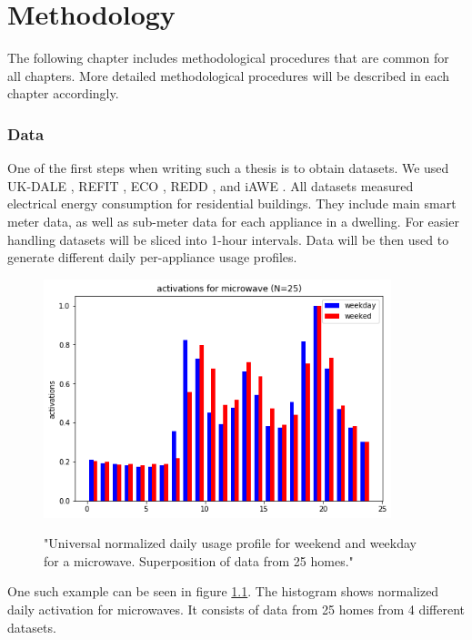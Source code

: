 
\chapter{Methodology} %

\label{Chapter10} 

The following chapter includes methodological procedures that are common for all chapters.
More detailed methodological procedures will be described in each chapter accordingly. 

\subsection{Data}

One of the first steps when writing such a thesis is to obtain datasets.
We used UK-DALE \cite{UKDALE}, REFIT \cite{REFIT}, ECO \cite{ECO}, REDD \cite{REDD}, and iAWE \cite{iAWE}.
All datasets measured electrical energy consumption for residential buildings. 
They include main smart meter data, as well as sub-meter data for each appliance in a dwelling. 
For easier handling datasets will be sliced into 1-hour intervals. 
Data will be then used to generate different daily per-appliance usage profiles.

\begin{figure}[H]
	\centering
	\caption{"Universal normalized daily usage profile for weekend and weekday for a microwave. Superposition of data from 25 homes."}
	\includegraphics[width=0.9\textwidth]{../Figures/microwave_norm_n25.png}
	\label{fig:UniNormMicrowave}
\end{figure}

One such example can be seen in figure \ref{fig:UniNormMicrowave}. The histogram shows normalized daily 
activation for microwaves. It consists of data from 25 homes from 4 different
datasets. 

